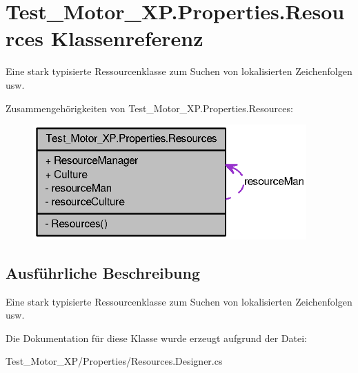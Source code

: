 \hypertarget{class_test___motor___x_p_1_1_properties_1_1_resources}{
\section{Test\_\-Motor\_\-XP.Properties.Resources Klassenreferenz}
\label{class_test___motor___x_p_1_1_properties_1_1_resources}
}


Eine stark typisierte Ressourcenklasse zum Suchen von lokalisierten Zeichenfolgen usw.  




Zusammengehörigkeiten von Test\_\-Motor\_\-XP.Properties.Resources:\nopagebreak
\begin{figure}[H]
\begin{center}
\leavevmode
\includegraphics[width=297pt]{class_test___motor___x_p_1_1_properties_1_1_resources__coll__graph}
\end{center}
\end{figure}


\subsection{Ausführliche Beschreibung}
Eine stark typisierte Ressourcenklasse zum Suchen von lokalisierten Zeichenfolgen usw. 

Die Dokumentation für diese Klasse wurde erzeugt aufgrund der Datei:\begin{DoxyCompactItemize}
\item 
Test\_\-Motor\_\-XP/Properties/Resources.Designer.cs\end{DoxyCompactItemize}
